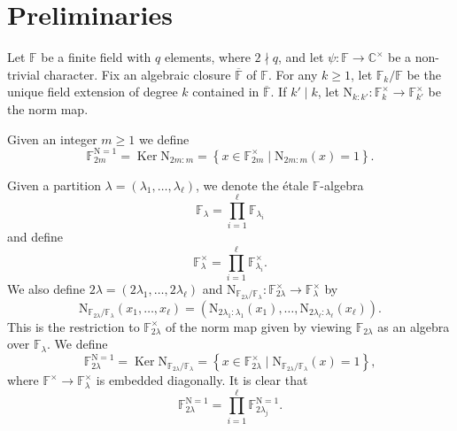 \documentclass[12pt, reqno]{amsart}
\theoremstyle{definition}
\theoremstyle{definition}
\theoremstyle{definition}
\newcommand{\cComplex}{\mathbb{C}}
\newcommand{\multiplicativegroup}[1]{#1^{\times}}
\newcommand{\etale}{\'etale }
\newcommand{\fieldCharacter}{\psi}
\newcommand{\FieldNorm}[2]{\mathrm{N}_{#1:#2}}
\newcommand{\aFieldNorm}{\mathrm{N}}
\newcommand{\finiteField}{\mathbb{F}}
\newcommand{\finiteFieldExtension}[1]{\finiteField_{#1}}
\newcommand{\NormOneGroup}[1]{\finiteFieldExtension{#1}^{\aFieldNorm = 1}}
\newcommand{\algebraicClosure}[1]{\overline{#1}}
\newcommand{\Kernel}{\operatorname{Ker}}
\begin{document}
\section{Preliminaries}
Let $\finiteField$ be a finite field with $q$ elements, where $2 \nmid q$, and let $\fieldCharacter \colon \finiteField \to \multiplicativegroup{\cComplex}$ be a non-trivial character. Fix an algebraic closure $\algebraicClosure{\finiteField}$ of $\finiteField$. For any $k \ge 1$, let $\finiteFieldExtension{k} \slash \finiteField$ be the unique field extension of degree $k$ contained in $\algebraicClosure{\finiteField}$. If $k' \mid k$, let $\FieldNorm{k}{k'} \colon \multiplicativegroup{\finiteFieldExtension{k}} \to \multiplicativegroup{\finiteFieldExtension{k'}}$ be the norm map.

Given an integer $m \ge 1$ we define $$\NormOneGroup{2m} = \Kernel \FieldNorm{2m}{m} = \left\{ x \in \multiplicativegroup{\finiteFieldExtension{2m}} \mid \FieldNorm{2m}{m}\left(x\right) = 1\right\}.$$

Given a partition $\lambda = \left(\lambda_1, \dots, \lambda_\ell\right)$, we denote the \etale $\finiteField$-algebra $$\finiteFieldExtension{\lambda} = \prod_{i=1}^{\ell} \finiteFieldExtension{\lambda_i}$$ and define
$$\multiplicativegroup{\finiteFieldExtension{\lambda}} = \prod_{i=1}^{\ell} \multiplicativegroup{\finiteFieldExtension{\lambda_i}}.$$
We also define $2 \lambda = \left(2 \lambda_1, \dots, 2 \lambda_{\ell}\right)$ and $\aFieldNorm_{\finiteFieldExtension{2\lambda} \slash \finiteFieldExtension{\lambda}} \colon \multiplicativegroup{\finiteFieldExtension{2 \lambda}} \to \multiplicativegroup{\finiteFieldExtension{\lambda}}$ by $$\aFieldNorm_{\finiteFieldExtension{2\lambda} \slash \finiteFieldExtension{\lambda}}\left(x_1,\dots,x_{\ell}\right) = \left(\FieldNorm{2\lambda_1}{\lambda_1}\left(x_1\right), \dots, \FieldNorm{2\lambda_{\ell}}{\lambda_{\ell}}\left(x_{\ell}\right)\right).$$
This is the restriction to $\multiplicativegroup{\finiteFieldExtension{2 \lambda}}$ of the norm map given by viewing $\finiteFieldExtension{2\lambda}$ as an algebra over $\finiteFieldExtension{\lambda}$. We define $$\NormOneGroup{2\lambda} = \Kernel \aFieldNorm_{\finiteFieldExtension{2\lambda} \slash \finiteFieldExtension{\lambda}} = \left\{x \in \multiplicativegroup{\finiteFieldExtension{2\lambda}} \mid \aFieldNorm_{\finiteFieldExtension{2\lambda} \slash \finiteFieldExtension{\lambda}}\left(x\right) = 1\right\},$$
where $\multiplicativegroup{\finiteField} \to \multiplicativegroup{\finiteFieldExtension{\lambda}}$ is embedded diagonally. It is clear that $$\NormOneGroup{2\lambda} = \prod_{i=1}^{\ell} \NormOneGroup{2 \lambda_j}.$$
\end{document}
